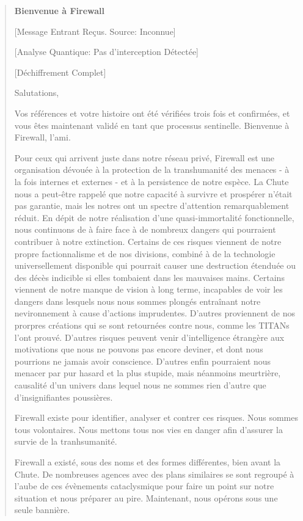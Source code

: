 \begin{quotation} 

\textbf{Bienvenue à Firewall} 

[Message Entrant Reçus. Source: Inconnue] 

[Analyse Quantique: Pas d'interception Détectée] 

[Déchiffrement Complet] 

Salutations, 

Vos références et votre histoire ont été vérifiées trois fois et confirmées, et vous êtes maintenant validé en tant que processus sentinelle. Bienvenue à Firewall, l'ami. 

Pour ceux qui arrivent juste dans notre réseau privé, Firewall est une organisation dévouée à la protection de la transhumanité des menaces - à la fois internes et externes - et à la persistence de notre espèce. La Chute nous a peut-être rappelé que notre capacité à survivre et prospérer n'était pas garantie, mais les notres ont un spectre d'attention remarquablement réduit. En dépit de notre réalisation d'une quasi-immortalité fonctionnelle, nous continuons de à faire face à de nombreux dangers qui pourraient contribuer à notre extinction. Certains de ces risques viennent de notre propre factionnalisme et de nos divisions, combiné à de la technologie universellement disponible qui pourrait causer une destruction étenduée ou des décès indicible si elles tombaient dans les mauvaises mains. Certains viennent de notre manque de vision à long terme, incapables de voir les dangers dans lesquels nous nous sommes plongés entraînant notre nevironnement à cause d'actions imprudentes. D'autres proviennent de nos prorpres créations qui se sont retournées contre nous, comme les TITANs l'ont prouvé. D'autres risques peuvent venir d'intelligence étrangère aux motivations que nous ne pouvons pas encore deviner, et dont nous pourrions ne jamais avoir conscience. D'autres enfin pourraient nous menacer par pur hasard et la plus stupide, mais néanmoins meurtrière, causalité d'un univers dans lequel nous ne sommes rien d'autre que d'insignifiantes poussières. 

Firewall existe pour identifier, analyser et contrer ces risques. Nous sommes tous volontaires. Nous mettons tous nos vies en danger afin d'assurer la survie de la tranhsumanité. 

Firewall a existé, sous des noms et des formes différentes, bien avant la Chute. De nombreuses agences avec des plans similaires se sont regroupé à l'aube de ces évènements cataclysmique pour faire un point sur notre situation et nous préparer au pire. Maintenant, nous opérons sous une seule bannière. 


\end{quotation}
